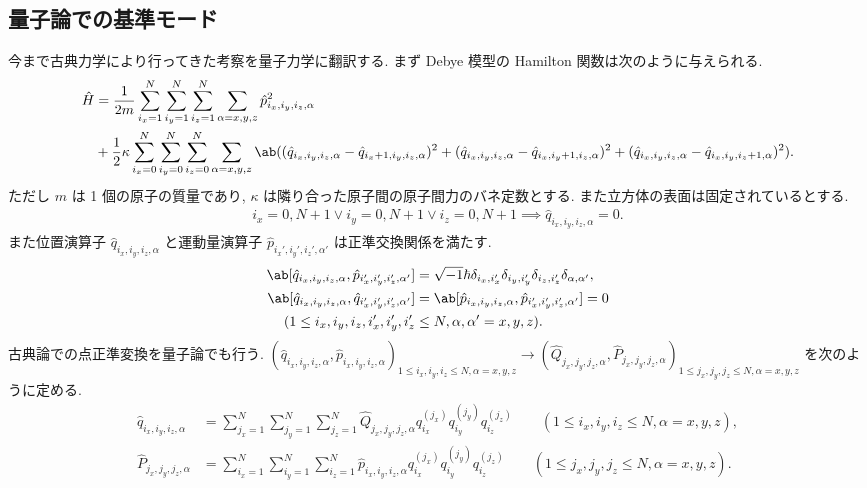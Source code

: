 \documentclass[uplatex,diffipdfmx,a4paper,11pt]{jlreq}
\theoremstyle{definition}
\begin{document}
\subsection{量子論での基準モード}
今まで古典力学により行ってきた考察を量子力学に翻訳する. まず Debye 模型の Hamilton 関数は次のように与えられる.
\begin{align}
  \hat{H} & = \frac{1}{2m}\sum_{i_x=1}^{N}\sum_{i_y=1}^{N}\sum_{i_z=1}^{N}\sum_{\alpha=x,y,z}\hat{p}_{i_x,i_y,i_z,\alpha}^2                                                                                                                                                                                       \\
          & + \frac{1}{2}\kappa\sum_{i_x=0}^{N}\sum_{i_y=0}^{N}\sum_{i_z=0}^{N}\sum_{\alpha=x,y,z}\ab((\hat{q}_{i_x,i_y,i_z,\alpha} - \hat{q}_{i_x+1,i_y,i_z,\alpha})^2 + (\hat{q}_{i_x,i_y,i_z,\alpha} - \hat{q}_{i_x,i_y+1,i_z,\alpha})^2 + (\hat{q}_{i_x,i_y,i_z,\alpha} - \hat{q}_{i_x,i_y,i_z+1,\alpha})^2).
\end{align}
ただし $m$ は 1 個の原子の質量であり, $\kappa$ は隣り合った原子間の原子間力のバネ定数とする. また立方体の表面は固定されているとする.
\begin{align}
  i_x = 0, N+1\lor i_y = 0, N+1\lor i_z = 0, N+1 \implies \hat{q}_{i_x,i_y,i_z,\alpha} = 0.
\end{align}
また位置演算子 $\hat{q}_{i_x,i_y,i_z,\alpha}$ と運動量演算子 $\hat{p}_{i_x',i_y',i_z',\alpha'}$ は正準交換関係を満たす.
\begin{align}
  \ab[\hat{q}_{i_x,i_y,i_z,\alpha}, \hat{p}_{i_x',i_y',i_z',\alpha'}] & = \sqrt{-1}\hbar\delta_{i_x,i_x'}\delta_{i_y,i_y'}\delta_{i_z,i_z'}\delta_{\alpha,\alpha'}, \\
  \ab[\hat{q}_{i_x,i_y,i_z,\alpha}, \hat{q}_{i_x',i_y',i_z',\alpha'}] & = \ab[\hat{p}_{i_x,i_y,i_z,\alpha}, \hat{p}_{i_x',i_y',i_z',\alpha'}] = 0                   \\
  (1\leq i_x,i_y,i_z,i_x',i_y',i_z'                                   & \leq N, \alpha,\alpha' = x,y,z).
\end{align}
古典論での点正準変換を量子論でも行う. $(\hat{q}_{i_x,i_y,i_z,\alpha}, \hat{p}_{i_x,i_y,i_z,\alpha})_{1\leq i_x,i_y,i_z\leq N,\alpha=x,y,z}\to(\hat{Q}_{j_x,j_y,j_z,\alpha}, \hat{P}_{j_x,j_y,j_z,\alpha})_{1\leq j_x,j_y,j_z\leq N,\alpha=x,y,z}$ を次のように定める.
\begin{align}
  \hat{q}_{i_x,i_y,i_z,\alpha} & = \sum_{j_x=1}^{N}\sum_{j_y=1}^{N}\sum_{j_z=1}^{N}\hat{Q}_{j_x,j_y,j_z,\alpha}q_{i_x}^{(j_x)}q_{i_y}^{(j_y)}q_{i_z}^{(j_z)} \qquad (1\leq i_x,i_y,i_z \leq N, \alpha = x,y,z), \\
  \hat{P}_{j_x,j_y,j_z,\alpha} & = \sum_{i_x=1}^{N}\sum_{i_y=1}^{N}\sum_{i_z=1}^{N}\hat{p}_{i_x,i_y,i_z,\alpha}q_{i_x}^{(j_x)}q_{i_y}^{(j_y)}q_{i_z}^{(j_z)} \qquad (1\leq j_x,j_y,j_z \leq N, \alpha = x,y,z).
\end{align}
\end{document}
